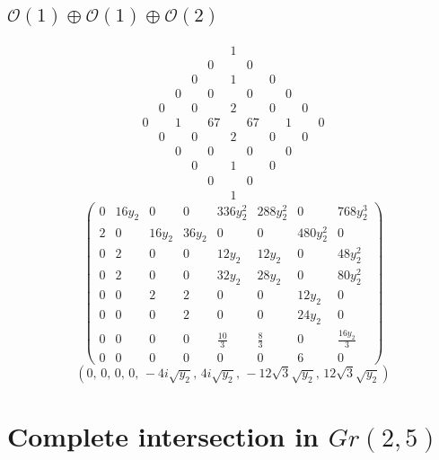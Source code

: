 \documentclass[11pt]{amsart}
\begin{document}
\subsection{$\mathcal{O}(1)\oplus \mathcal{O}(1) \oplus \mathcal{O}(2)$}
\[
\begin{array}{ccccccccccc}
&&&&&1&&&&&\\
&&&&0&&0&&&&\\
&&&0&&1&&0&&&\\
&&0&&0&&0&&0&&\\
&0&&0&&2&&0&&0&\\
0&&1&&67&&67&&1&&0\\
&0&&0&&2&&0&&0&\\
&&0&&0&&0&&0&&\\
&&&0&&1&&0&&&\\
&&&&0&&0&&&&\\
&&&&&1&&&&&
\end{array}
\]
\[
\begin{pmatrix}
0 & 16y_{2} & 0 & 0 & 336y_{2}^{2} & 288y_{2}^{2} & 0 & 768y_{2}^{3} \\
2 & 0 & 16y_{2} & 36y_{2} & 0 & 0 & 480y_{2}^{2} & 0 \\
0 & 2 & 0 & 0 & 12y_{2} & 12y_{2} & 0 & 48y_{2}^{2} \\
0 & 2 & 0 & 0 & 32y_{2} & 28y_{2} & 0 & 80y_{2}^{2} \\
0 & 0 & 2 & 2 & 0 & 0 & 12y_{2} & 0 \\
0 & 0 & 0 & 2 & 0 & 0 & 24y_{2} & 0 \\
0 & 0 & 0 & 0 & \frac{10}{3} & \frac{8}{3} & 0 & \frac{16y_{2}}{3} \\
0 & 0 & 0 & 0 & 0 & 0 & 6 & 0
\end{pmatrix}
\]
\[
\left(
0,\,
0,\,
0,\,
0,\,
-4i\sqrt{y_{2}},\,
4i\sqrt{y_{2}},\,
-12\sqrt{3}\sqrt{y_{2}},\,
12\sqrt{3}\sqrt{y_{2}}
\right)
\]

\section{Complete intersection in $Gr(2,5)$}
\end{document}
